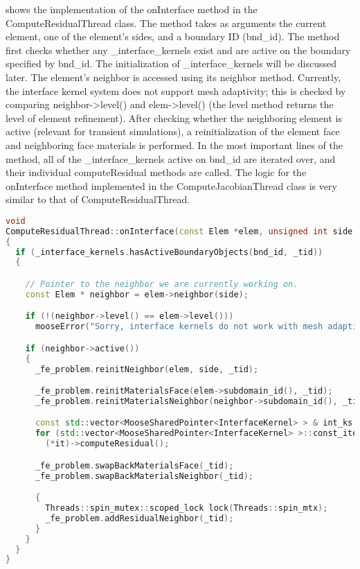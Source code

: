  shows the implementation of the onInterface method in the ComputeResidualThread class. The method takes as arguments the current element, one of the element's sides, and a boundary ID (bnd\_id). The method first checks whether any \_interface\_kernels exist and are active on the boundary specified by bnd\_id. The initialization of \_interface\_kernels will be discussed later. The element's neighbor is accessed using its neighbor method. Currently, the interface kernel system does not support mesh adaptivity; this is checked by comparing neighbor->level() and elem->level() (the level method returns the level of element refinement). After checking whether the neighboring element is active (relevant for transient simulations), a reinitialization of the element face and neighboring face materials is performed. In the most important lines of the method, all of the \_interface\_kernels active on bnd\_id are iterated over, and their individual computeResidual methods are called. The logic for the onInterface method implemented in the ComputeJacobianThread class is very similar to that of ComputeResidualThread.

\begin{lstlisting}[language = C++, caption = ComputeResidualThread::onInterface method. The logic is much the same for the ComputeJacobianThread::onInterface method. , label = code:ComputeResidualThread]
void
ComputeResidualThread::onInterface(const Elem *elem, unsigned int side, BoundaryID bnd_id)
{
  if (_interface_kernels.hasActiveBoundaryObjects(bnd_id, _tid))
  {

    // Pointer to the neighbor we are currently working on.
    const Elem * neighbor = elem->neighbor(side);

    if (!(neighbor->level() == elem->level()))
      mooseError("Sorry, interface kernels do not work with mesh adaptivity");

    if (neighbor->active())
    {
      _fe_problem.reinitNeighbor(elem, side, _tid);

      _fe_problem.reinitMaterialsFace(elem->subdomain_id(), _tid);
      _fe_problem.reinitMaterialsNeighbor(neighbor->subdomain_id(), _tid);

      const std::vector<MooseSharedPointer<InterfaceKernel> > & int_ks = _interface_kernels.getActiveBoundaryObjects(bnd_id, _tid);
      for (std::vector<MooseSharedPointer<InterfaceKernel> >::const_iterator it = int_ks.begin(); it != int_ks.end(); ++it)
        (*it)->computeResidual();

      _fe_problem.swapBackMaterialsFace(_tid);
      _fe_problem.swapBackMaterialsNeighbor(_tid);

      {
        Threads::spin_mutex::scoped_lock lock(Threads::spin_mtx);
        _fe_problem.addResidualNeighbor(_tid);
      }
    }
  }
}
\end{lstlisting}

